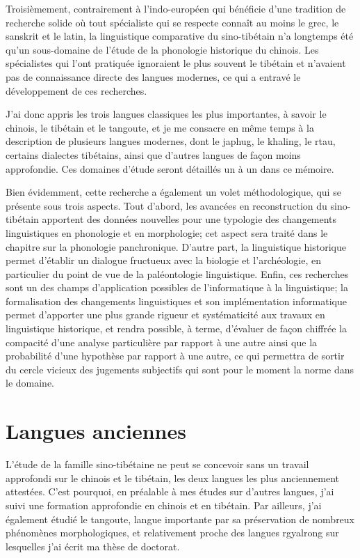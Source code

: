 \documentclass[oldfontcommands,oneside,a4paper,11pt]{memoir}
\begin{document}
Troisièmement, contrairement à l'indo-européen qui bénéficie d'une tradition de recherche solide où tout spécialiste qui se respecte connaît au moins le grec, le sanskrit et le latin, la linguistique comparative du sino-tibétain n'a longtemps été qu'un sous-domaine de l'étude de la phonologie historique du chinois. Les spécialistes qui l'ont pratiquée ignoraient le plus souvent le tibétain et n'avaient pas de connaissance directe des langues modernes, ce qui a entravé le développement de ces recherches.

J'ai donc appris les trois langues classiques les plus importantes, à savoir le chinois, le tibétain et le tangoute, et je me consacre en même temps à la description de plusieurs langues modernes, dont le japhug, le khaling, le rtau, certains dialectes tibétains, ainsi que d'autres langues de façon moins approfondie. Ces domaines d'étude  seront détaillés un à un dans ce mémoire.

Bien évidemment, cette recherche a également un volet méthodologique, qui se présente sous trois aspects. Tout d'abord, les avancées en reconstruction du sino-tibétain apportent des données nouvelles pour une typologie des changements linguistiques en phonologie et en morphologie; cet aspect sera traité dans le chapitre sur la phonologie panchronique. D'autre part, la linguistique historique permet d'établir un dialogue fructueux avec la biologie et l'archéologie, en particulier du point de vue de la paléontologie linguistique. Enfin, ces recherches sont un des champs d'application possibles de l'informatique à la linguistique; la formalisation des changements linguistiques et son implémentation informatique permet d'apporter une plus grande rigueur et systématicité  aux travaux en linguistique historique, et rendra possible, à terme, d'évaluer de façon chiffrée la compacité d'une analyse particulière par rapport à une autre ainsi que la probabilité d'une hypothèse par rapport à une autre, ce qui permettra de sortir du cercle vicieux des jugements subjectifs qui sont pour le moment la norme dans le domaine.


\chapter{Langues anciennes}
L’étude de la famille sino-tibétaine ne peut se concevoir sans un travail approfondi sur le chinois et le tibétain, les deux langues les plus anciennement attestées. C’est pourquoi, en préalable à mes études sur d’autres langues, j’ai suivi une formation approfondie en chinois et en tibétain.  Par ailleurs, j'ai également étudié le tangoute, langue importante par sa préservation de nombreux phénomènes morphologiques, et relativement proche des langues rgyalrong sur lesquelles j'ai écrit ma thèse de doctorat.
\end{document}
